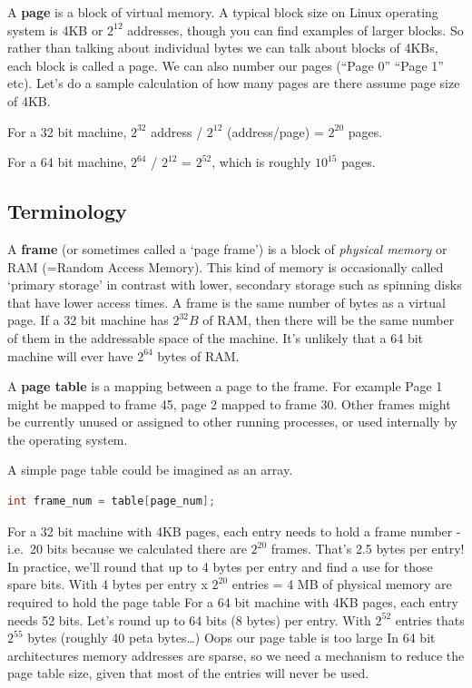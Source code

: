 A \textbf{page} is a block of virtual memory. A typical block size on Linux operating system is 4KB or $2^{12}$ addresses, though you can find examples of larger blocks. So rather than talking about individual bytes we can talk about blocks of 4KBs, each block is called a page. We can also number our pages (``Page 0'' ``Page 1'' etc). Let's do a sample calculation of how many pages are there assume page size of 4KB.

\begin{shaded*}
For a 32 bit machine, $2^{32}$ address / $2^{12}$ (address/page) = $2^{20}$ pages.

For a 64 bit machine, $2^{64}$ / $2^{12}$ = $2^{52}$, which is roughly $10^{15}$ pages.
\end{shaded*}

\subsection{Terminology}

A \textbf{frame} (or sometimes called a `page frame') is a block of \emph{physical memory} or RAM (=Random Access Memory). This kind of memory is occasionally called `primary storage' in contrast with lower, secondary storage such as spinning disks that have lower access times. A frame is the same number of bytes as a virtual page. If a 32 bit machine has $2^{32} B$ of RAM, then there will be the same number of them in the addressable space of the machine. It's unlikely that a 64 bit machine will ever have $2^{64}$ bytes of RAM.

A \textbf{page table} is a mapping between a page to the frame. For example Page 1 might be mapped to frame 45, page 2 mapped to frame 30. Other frames might be currently unused or assigned to other running processes, or used internally by the operating system.

A simple page table could be imagined as an array.
\begin{lstlisting}[language=C]
int frame_num = table[page_num]; 
\end{lstlisting}

For a 32 bit machine with 4KB pages, each entry needs to hold a frame number - i.e.~20 bits because we calculated there are $2^{20}$ frames. That's 2.5 bytes per entry! In practice, we'll round that up to 4 bytes per entry and find a use for those spare bits. With 4 bytes per entry x $2^{20}$ entries = 4 MB of physical memory are required to hold the page table 
For a 64 bit machine with 4KB pages, each entry needs 52 bits. Let's round up to 64 bits (8 bytes) per entry. With $2^{52}$ entries thats $2^{55}$ bytes (roughly 40 peta bytes\ldots{}) Oops our page table is too large 
In 64 bit architectures memory addresses are sparse, so we need a mechanism to reduce the page table size, given that most of the entries will never be used.

